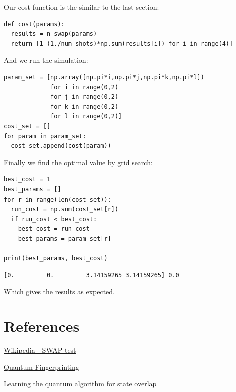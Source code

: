 \documentclass[11pt]{article}
\begin{document}
Our cost function is the similar to the last section:

\begin{verbatim}
def cost(params):
  results = n_swap(params)
  return [1-(1./num_shots)*np.sum(results[i]) for i in range(4)]
\end{verbatim}


And we run the simulation:

\begin{verbatim}
param_set = [np.array([np.pi*i,np.pi*j,np.pi*k,np.pi*l])
             for i in range(0,2)
             for j in range(0,2)
             for k in range(0,2)
             for l in range(0,2)]
cost_set = []
for param in param_set:
  cost_set.append(cost(param))
\end{verbatim}

Finally we find the optimal value by grid search:

\begin{verbatim}
best_cost = 1
best_params = []
for r in range(len(cost_set)):
  run_cost = np.sum(cost_set[r])
  if run_cost < best_cost:
    best_cost = run_cost
    best_params = param_set[r]

print(best_params, best_cost)
\end{verbatim}

\begin{verbatim}
[0.         0.         3.14159265 3.14159265] 0.0
\end{verbatim}


Which gives the results as expected.

\pagebreak

\section{References}
\label{sec:orgbe5b94e}

\href{https://en.wikipedia.org/wiki/Swap\_test}{Wikipedia - SWAP test}

\href{https://arxiv.org/abs/quant-ph/0102001}{Quantum Fingerprinting}

\href{https://arxiv.org/abs/1803.04114}{Learning the quantum algorithm for state overlap}
\end{document}
